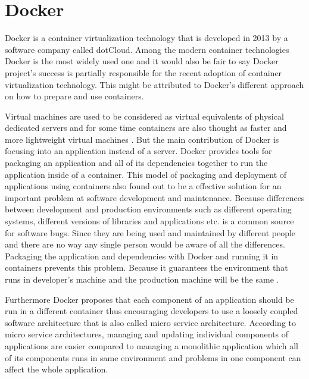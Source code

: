 \documentclass[12pt,oneandhalf,chaparabic,ceng,ms,eng,oneside,pntc]{gsufbe}
\begin{document}
\section{Docker}
Docker is a container virtualization technology \cite{docker} that is developed in 2013 by a software
company called
dotCloud.  Among the modern container technologies Docker is the most widely used one and it would also
be fair to say Docker project's success is partially responsible for the recent adoption of container
virtualization technology.  This might be attributed to Docker's different approach on how to prepare 
and use containers.

Virtual machines are used to be considered as virtual equivalents of physical dedicated servers and for
some time containers are also thought as faster and more lightweight virtual machines
\cite{adufu_is_2015}.  But the main
contribution of Docker is focusing into an application instead of a server.  Docker provides tools for
packaging an application and all of its dependencies together to run the application inside of a
container.  This model of packaging and deployment of applications using containers also found out to be
a effective solution for an important problem at software development and maintenance.  Because 
differences between development and production environments such as different operating systems, 
different versions of libraries and applications etc. is a common source for software bugs.  Since they
are being used and  maintained by different people and there are no way any single person would be
aware of all the differences.  Packaging the application and dependencies with Docker and running it in
containers prevents this problem.  Because it guarantees the environment that runs in developer’s
machine and the production machine will be the same \cite{boettiger_introduction_2015}.

Furthermore Docker proposes that each component of an application should be run in a 
different container thus encouraging developers to use a loosely coupled software architecture that is 
also called micro service architecture.  According to micro service architectures, managing and updating
individual components of applications are easier compared to managing a monolithic application which
all of its components runs in same environment and problems in one component can affect the whole
application.
\end{document}
